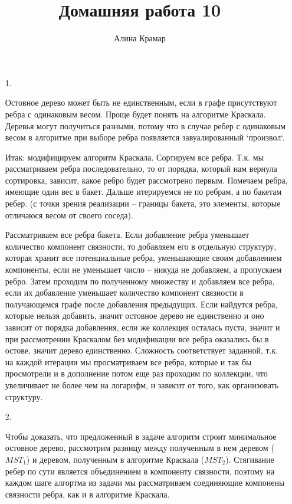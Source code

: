 \documentclass{article}
\begin{document}
\title{Домашняя работа 10}
\author{Алина Крамар}

\maketitle
\begin{enumerate}

\item[1.]

Остовное дерево может быть не единственным, если в графе присутствуют
ребра с одинаковым весом. Проще будет понять на алгоритме
Краскала. Деревья могут получиться разными, потому что в случае ребер
с одинаковым весом в алгоритме при выборе ребра появляется
завуалированный `произвол`.

Итак: модифицируем алгоритм Краскала.
Сортируем все ребра. Т.к. мы рассматриваем ребра последовательно, то
от порядка, который нам вернула сортировка, зависит, какое ребро будет
рассмотрено первым. Помечаем ребра, имеющие один вес в бакет. Дальше
итерируемся не по ребрам, а по бакетам ребер. (с точки зрения
реализации -- границы бакета, это элементы, которые отличаюся весом от
своего соседа).

Рассматриваем все ребра бакета. Если добавление ребра уменьшает
количество компонент связности, то добавляем его в отдельную структуру, которая хранит все потенциальные
ребра, уменьшающие своим добавлением компоненты, если не уменьшает
число -- никуда не добавляем, а пропускаем ребро. Затем проходим по
полученному множеству и добавляем все ребра, если их добавление
уменьшает количество компонент связности в получающемся графе после
добавления предыдущих. Если найдутся ребра, которые нельзя добавить,
значит остовное дерево не единственно и оно зависит от порядка добавления,
если же коллекция осталась пуста, значит и при рассмотрении Краскалом
без модификации все ребра оказались бы в остове, значит дерево
единственно. Сложность соответствует заданной, т.к. на каждой итерации
мы просматриваем все ребра, которые и так бы просмотрели и в
дополнение потом еще раз проходим по коллекции, что увеличивает не
более чем на логарифм, и зависит от того, как организовать структуру.

\item[2.]

Чтобы доказать, что предложенный в задаче алгоритм строит минимальное
остовное дерево, рассмотрим разницу между полученным в нем деревом
($MST_{1}$) и деревом, полученным в алгоритме Краскала ($MST_{2}$). Стягивание ребер по сути является
объединением в компоненту связности, поэтому на каждом шаге алгортма
из задачи мы рассматриваем соединяющие компонены связности ребра, как
и в алгоритме Краскала.


\end{enumerate}
\end{document}
